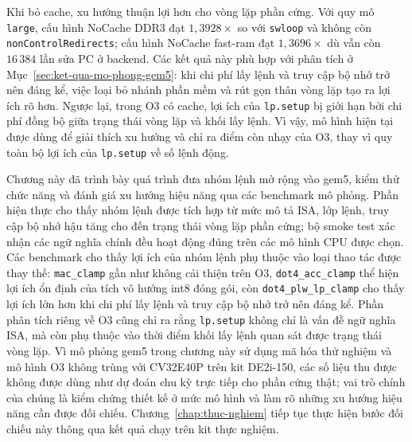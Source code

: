 \documentclass[../DoAn.tex]{subfiles}
\begin{document}
Khi bỏ cache, xu hướng thuận lợi hơn cho vòng lặp phần cứng. Với quy mô \texttt{large}, cấu hình NoCache DDR3 đạt \(1{,}3928\times\) so với \texttt{swloop} và không còn \texttt{nonControlRedirects}; cấu hình NoCache fast-ram đạt \(1{,}3696\times\) dù vẫn còn \(16\,384\) lần sửa PC ở backend. Các kết quả này phù hợp với phân tích ở Mục~\ref{sec:ket-qua-mo-phong-gem5}: khi chi phí lấy lệnh và truy cập bộ nhớ trở nên đáng kể, việc loại bỏ nhánh phần mềm và rút gọn thân vòng lặp tạo ra lợi ích rõ hơn. Ngược lại, trong O3 có cache, lợi ích của \texttt{lp.setup} bị giới hạn bởi chi phí đồng bộ giữa trạng thái vòng lặp và khối lấy lệnh. Vì vậy, mô hình hiện tại được dùng để giải thích xu hướng và chỉ ra điểm còn nhạy của O3, thay vì quy toàn bộ lợi ích của \texttt{lp.setup} về số lệnh động.

Chương này đã trình bày quá trình đưa nhóm lệnh mở rộng vào gem5, kiểm thử chức năng và đánh giá xu hướng hiệu năng qua các benchmark mô phỏng. Phần hiện thực cho thấy nhóm lệnh được tích hợp từ mức mô tả ISA, lớp lệnh, truy cập bộ nhớ hậu tăng cho đến trạng thái vòng lặp phần cứng; bộ smoke test xác nhận các ngữ nghĩa chính đều hoạt động đúng trên các mô hình CPU được chọn. Các benchmark cho thấy lợi ích của nhóm lệnh phụ thuộc vào loại thao tác được thay thế: \texttt{mac\_clamp} gần như không cải thiện trên O3, \texttt{dot4\_acc\_clamp} thể hiện lợi ích ổn định của tích vô hướng int8 đóng gói, còn \texttt{dot4\_plw\_lp\_clamp} cho thấy lợi ích lớn hơn khi chi phí lấy lệnh và truy cập bộ nhớ trở nên đáng kể. Phần phân tích riêng về O3 cũng chỉ ra rằng \texttt{lp.setup} không chỉ là vấn đề ngữ nghĩa ISA, mà còn phụ thuộc vào thời điểm khối lấy lệnh quan sát được trạng thái vòng lặp. Vì mô phỏng gem5 trong chương này sử dụng mã hóa thử nghiệm và mô hình O3 không trùng với CV32E40P trên kit DE2i-150, các số liệu thu được không được dùng như dự đoán chu kỳ trực tiếp cho phần cứng thật; vai trò chính của chúng là kiểm chứng thiết kế ở mức mô hình và làm rõ những xu hướng hiệu năng cần được đối chiếu. Chương~\ref{chap:thuc-nghiem} tiếp tục thực hiện bước đối chiếu này thông qua kết quả chạy trên kit thực nghiệm.
\end{document}
